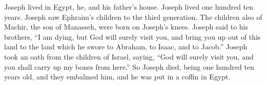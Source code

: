 \myverse{}Joseph lived in Egypt, he, and his father’s house. Joseph lived one hundred ten years. \myverse{}Joseph saw Ephraim’s children to the third generation. The children also of Machir, the son of Manasseh, were born on Joseph’s knees. \myverse{}Joseph said to his brothers, “I am dying, but God will surely visit you, and bring you up out of this land to the land which he swore to Abraham, to Isaac, and to Jacob.” \myverse{}Joseph took an oath from the children of Israel, saying, “God will surely visit you, and you shall carry up my bones from here.” \myverse{}So Joseph died, being one hundred ten years old, and they embalmed him, and he was put in a coffin in Egypt.


